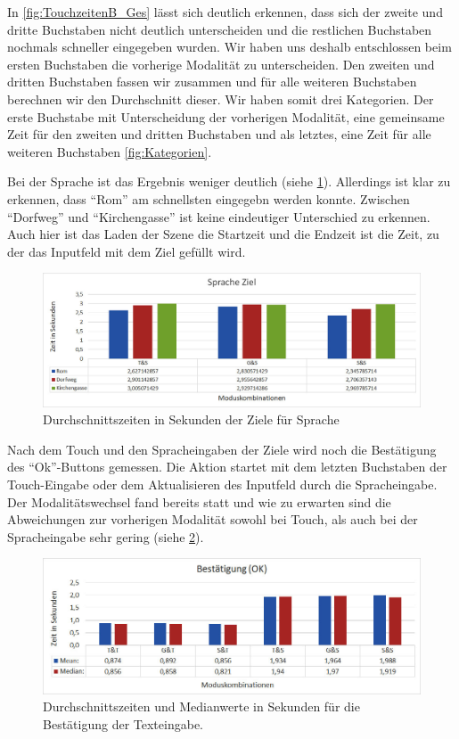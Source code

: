 In \ref{fig:TouchzeitenB_Ges} lässt sich deutlich erkennen, dass sich der zweite und dritte Buchstaben nicht deutlich unterscheiden und die restlichen Buchstaben nochmals schneller eingegeben wurden. 
Wir haben uns deshalb entschlossen beim ersten Buchstaben die vorherige Modalität zu unterscheiden. 
Den zweiten und dritten Buchstaben fassen wir zusammen und für alle weiteren Buchstaben berechnen wir den Durchschnitt dieser. 
Wir haben somit drei Kategorien.
Der erste Buchstabe mit Unterscheidung der vorherigen Modalität, eine gemeinsame Zeit für den zweiten und dritten Buchstaben und als letztes, eine Zeit für alle weiteren Buchstaben \ref{fig:Kategorien}.

Bei der Sprache ist das Ergebnis weniger deutlich (siehe \ref{fig:SpracheZiel}).
Allerdings ist klar zu erkennen, dass "`Rom"' am schnellsten eingegebn werden konnte. 
Zwischen "`Dorfweg"' und "`Kirchengasse"' ist keine eindeutiger Unterschied zu erkennen. 
Auch hier ist das Laden der Szene die Startzeit und die Endzeit ist die Zeit, zu der das Inputfeld mit dem Ziel gefüllt wird.
\begin{figure}[ht]
  \centering
  \includegraphics[width=1\textwidth]{img/SpracheZiel.JPG}
  \caption{Durchschnittszeiten in Sekunden der Ziele für Sprache}
  \label{fig:SpracheZiel}
\end{figure} 

Nach dem Touch und den Spracheingaben der Ziele wird noch die Bestätigung des "`Ok"'-Buttons gemessen. 
Die Aktion startet mit dem letzten Buchstaben der Touch-Eingabe oder dem Aktualisieren des Inputfeld durch die Spracheingabe. 
Der Modalitätswechsel fand bereits statt und wie zu erwarten sind die Abweichungen zur vorherigen Modalität sowohl bei Touch, als auch bei der Spracheingabe sehr gering (siehe \ref{fig:Bestaetigung_OK}).
\begin{figure}[ht]
  \centering
  \includegraphics[width=1\textwidth]{img/B_OK.jpg}
  \caption{Durchschnittszeiten und Medianwerte in Sekunden für die Bestätigung der Texteingabe.}
  \label{fig:Bestaetigung_OK}
\end{figure} 

